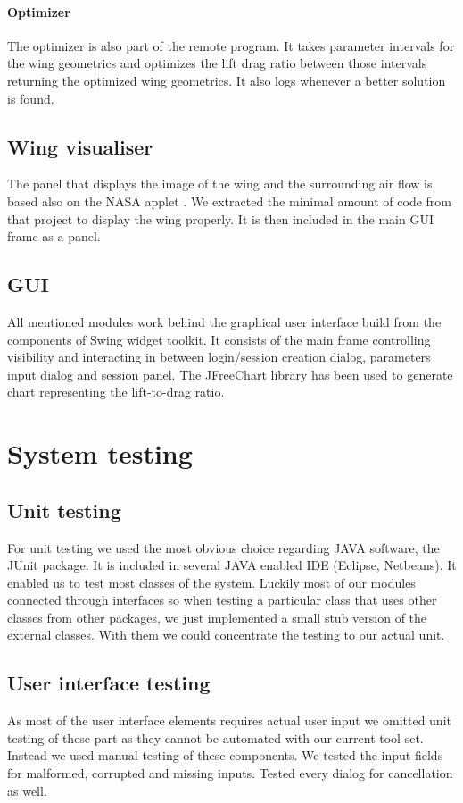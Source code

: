 \documentclass[10pt,a4paper]{report}
\begin{document}
\subsubsection{Optimizer}
The optimizer is also part of the remote program. It takes parameter intervals for the wing geometrics and optimizes the lift drag ratio between those intervals returning the optimized wing geometrics. It also logs whenever a better solution is found.

\section{Wing visualiser}
The panel that displays the image of the wing and the surrounding air flow is based also on the NASA applet \cite{WWW:NASA}. We extracted the minimal amount of code from that project to display the wing properly. It is then included in the main GUI frame as a panel.

\section{GUI}
All mentioned modules work behind the graphical user interface build from the components of Swing widget toolkit. It consists of the main frame controlling visibility and interacting in between login/session creation dialog, parameters input dialog and session panel. The JFreeChart library \cite{WWW:JFreeChart} has been used to generate chart representing the lift-to-drag ratio.

\chapter{System testing}
\label{ch:test}
\section{Unit testing}
For unit testing we used the most obvious choice regarding JAVA software, the JUnit package. It is included in several JAVA enabled IDE (Eclipse, Netbeans). It enabled us to test most classes of the system. Luckily most of our modules connected through interfaces so when testing a particular class that uses other classes from other packages, we just implemented a small stub version of the external classes. With them we could concentrate the testing to our actual unit.

\section{User interface testing}
As most of the user interface elements requires actual user input we omitted unit testing of these part as they cannot be automated with our current tool set.  Instead we used manual testing of these components. We tested the input fields for malformed, corrupted and missing inputs. Tested every dialog for cancellation as well.
\end{document}

